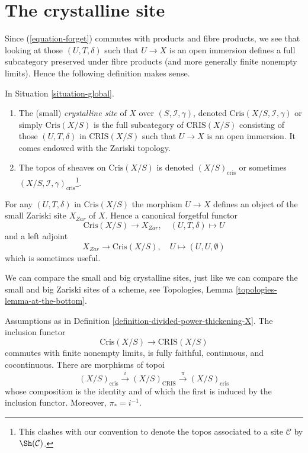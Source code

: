 \section{The crystalline site}
\label{section-site}

\noindent
Since (\ref{equation-forget}) commutes with products and fibre
products, we see that looking at those $(U, T, \delta)$ such that
$U \to X$ is an open immersion defines a full
subcategory preserved under fibre products (and more generally
finite nonempty limits). Hence the following
definition makes sense.

\begin{definition}
\label{definition-crystalline-site}
In Situation \ref{situation-global}.
\begin{enumerate}
\item The (small) {\it crystalline site} of $X$ over
$(S, \mathcal{I}, \gamma)$, denoted $\text{Cris}(X/S, \mathcal{I}, \gamma)$
or simply $\text{Cris}(X/S)$ is the full subcategory of $\text{CRIS}(X/S)$
consisting of those $(U, T, \delta)$ in $\text{CRIS}(X/S)$ such that
$U \to X$ is an open immersion. It comes endowed with the Zariski topology.
\item The topos of sheaves on $\text{Cris}(X/S)$ is denoted
$(X/S)_{\text{cris}}$ or sometimes
$(X/S, \mathcal{I}, \gamma)_{\text{cris}}$\footnote{This clashes with
our convention to denote the topos associated to a site $\mathcal{C}$
by $\Sh(\mathcal{C})$.}.
\end{enumerate}
\end{definition}

\noindent
For any $(U, T, \delta)$ in $\text{Cris}(X/S)$ the morphism $U \to X$
defines an object of the small Zariski site $X_{Zar}$ of $X$. Hence
a canonical forgetful functor
\begin{equation}
\label{equation-forget-small}
\text{Cris}(X/S) \longrightarrow X_{Zar},\quad
(U, T, \delta) \longmapsto U
\end{equation}
and a left adjoint
\begin{equation}
\label{equation-endow-trivial-small}
X_{Zar} \longrightarrow \text{Cris}(X/S),\quad
U \longmapsto (U, U, \emptyset)
\end{equation}
which is sometimes useful.

\medskip\noindent
We can compare the small and big crystalline sites, just like
we can compare the small and big Zariski sites of a scheme, see
Topologies, Lemma \ref{topologies-lemma-at-the-bottom}.

\begin{lemma}
\label{lemma-compare-big-small}
Assumptions as in Definition \ref{definition-divided-power-thickening-X}.
The inclusion functor
$$
\text{Cris}(X/S) \to \text{CRIS}(X/S)
$$
commutes with finite nonempty limits, is fully faithful, continuous,
and cocontinuous. There are morphisms of topoi
$$
(X/S)_{\text{cris}} \xrightarrow{i} (X/S)_{\text{CRIS}}
\xrightarrow{\pi} (X/S)_{\text{cris}}
$$
whose composition is the identity and of which the first is induced
by the inclusion functor. Moreover, $\pi_* = i^{-1}$.
\end{lemma}

